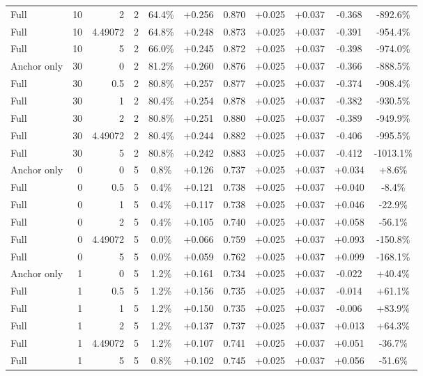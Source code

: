 \begin{table}[htbp]
\begin{tabular}{lrrrccccccc}
Full & 10 & 2 & 2 & 64.4\% & +0.256 & 0.870 & +0.025 & +0.037 & -0.368 & -892.6\% \\
Full & 10 & 4.49072 & 2 & 64.8\% & +0.248 & 0.873 & +0.025 & +0.037 & -0.391 & -954.4\% \\
Full & 10 & 5 & 2 & 66.0\% & +0.245 & 0.872 & +0.025 & +0.037 & -0.398 & -974.0\% \\
Anchor only & 30 & 0 & 2 & 81.2\% & +0.260 & 0.876 & +0.025 & +0.037 & -0.366 & -888.5\% \\
Full & 30 & 0.5 & 2 & 80.8\% & +0.257 & 0.877 & +0.025 & +0.037 & -0.374 & -908.4\% \\
Full & 30 & 1 & 2 & 80.4\% & +0.254 & 0.878 & +0.025 & +0.037 & -0.382 & -930.5\% \\
Full & 30 & 2 & 2 & 80.8\% & +0.251 & 0.880 & +0.025 & +0.037 & -0.389 & -949.9\% \\
Full & 30 & 4.49072 & 2 & 80.4\% & +0.244 & 0.882 & +0.025 & +0.037 & -0.406 & -995.5\% \\
Full & 30 & 5 & 2 & 80.8\% & +0.242 & 0.883 & +0.025 & +0.037 & -0.412 & -1013.1\% \\
Anchor only & 0 & 0 & 5 & 0.8\% & +0.126 & 0.737 & +0.025 & +0.037 & +0.034 & +8.6\% \\
Full & 0 & 0.5 & 5 & 0.4\% & +0.121 & 0.738 & +0.025 & +0.037 & +0.040 & -8.4\% \\
Full & 0 & 1 & 5 & 0.4\% & +0.117 & 0.738 & +0.025 & +0.037 & +0.046 & -22.9\% \\
Full & 0 & 2 & 5 & 0.4\% & +0.105 & 0.740 & +0.025 & +0.037 & +0.058 & -56.1\% \\
Full & 0 & 4.49072 & 5 & 0.0\% & +0.066 & 0.759 & +0.025 & +0.037 & +0.093 & -150.8\% \\
Full & 0 & 5 & 5 & 0.0\% & +0.059 & 0.762 & +0.025 & +0.037 & +0.099 & -168.1\% \\
Anchor only & 1 & 0 & 5 & 1.2\% & +0.161 & 0.734 & +0.025 & +0.037 & -0.022 & +40.4\% \\
Full & 1 & 0.5 & 5 & 1.2\% & +0.156 & 0.735 & +0.025 & +0.037 & -0.014 & +61.1\% \\
Full & 1 & 1 & 5 & 1.2\% & +0.150 & 0.735 & +0.025 & +0.037 & -0.006 & +83.9\% \\
Full & 1 & 2 & 5 & 1.2\% & +0.137 & 0.737 & +0.025 & +0.037 & +0.013 & +64.3\% \\
Full & 1 & 4.49072 & 5 & 1.2\% & +0.107 & 0.741 & +0.025 & +0.037 & +0.051 & -36.7\% \\
Full & 1 & 5 & 5 & 0.8\% & +0.102 & 0.745 & +0.025 & +0.037 & +0.056 & -51.6\% \\

\end{tabular}
\end{table}
